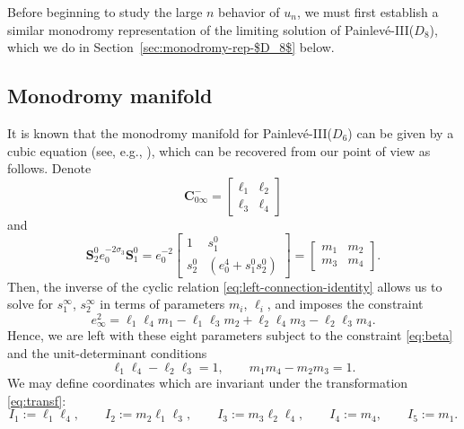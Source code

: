 \documentclass[pdftex]{sigma}
\numberwithin{equation}{section}
\begin{document}
Before beginning to study the large $n$ behavior of $u_n$, we must first establish a similar monodromy representation of the limiting solution of Painlev\'e-III($D_8$), which we do in Section~\ref{sec:monodromy-rep-$D_8$} below.

\subsection{Monodromy manifold}
\label{subsec:monodromy-D6}
It is known that the monodromy manifold for Painlev\'e-III($D_6$) can be given by a cubic equation (see, e.g., \cite{PS}), which can be recovered from our point of view as follows. Denote
\begin{equation*}
 \mathbf{C}_{0\infty}^-=\begin{bmatrix}
 \ell_1&\ell_2\\\ell_3&\ell_4
 \end{bmatrix}
\end{equation*}
and
\begin{equation*}
 \mathbf{S}^0_{2}e_0^{-2\sigma_3}\mathbf{S}_{1}^0 =e_0^{-2} \begin{bmatrix}
 1& s^0_1\\ s^0_2& \left(e_0^4+s^0_1s^0_2 \right)
 \end{bmatrix}=\begin{bmatrix}
 m_1&m_2\\m_3&m_4
 \end{bmatrix}.
\end{equation*}
Then, the inverse of the cyclic relation \eqref{eq:left-connection-identity} allows us to solve for $s_1^\infty$, $s_2^\infty$ in terms of parameters $m_i$, $\ell_i$, and imposes the constraint
\begin{equation}\label{eq:beta}
 e_\infty^2=\ell_1\ell_4m_1-\ell_1\ell_3m_2+\ell_2\ell_4m_3-\ell_2\ell_3m_4.
\end{equation}
Hence, we are left with these eight parameters subject to the constraint \eqref{eq:beta} and the unit-determinant conditions
\begin{equation}\label{eq:det}
 \ell_1\ell_4-\ell_2\ell_3=1,\qquad m_1m_4-m_2m_3=1.
\end{equation}
We may define coordinates which are invariant under the transformation \eqref{eq:transf}:
\begin{equation*}
 I_1:= \ell_1\ell_4,\qquad I_2 := m_2\ell_1\ell_3,\qquad I_3 :=m_3\ell_2\ell_4,\qquad I_4:= m_4, \qquad I_5:= m_1.
 \end{equation*}
\end{document}
